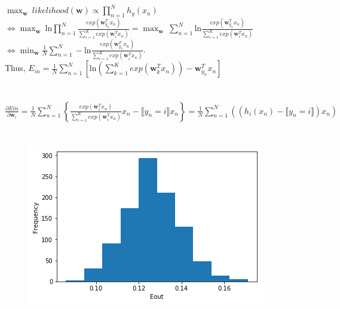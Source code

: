 \documentclass[a4paper,12pt]{article}
\begin{document}
\section{}
$\displaystyle \max_{\mathbf{w}} \ likelihood(\mathbf{w}) \propto \prod_{n=1}^{N} h_{y} (x_{n}) $ \\
$\Leftrightarrow \displaystyle \max_{\mathbf{w}} \ \text{ln} \prod_{n=1}^{N} \frac{exp(\mathbf{w}^{T}_{y_{n}}x_{n})}{\sum_{i=1}^{K}exp(\mathbf{w}_{i}^{T}x_{n})}=\displaystyle \max_{\mathbf{w}} \ \sum_{n=1}^{N} \text{ln}  \frac{exp(\mathbf{w}^{T}_{y_{n}}x_{n})}{\sum_{i=1}^{K}exp(\mathbf{w}_{i}^{T}x_{n})}$ \\
$\Leftrightarrow \displaystyle \min_{\mathbf{w}} \frac{1}{N} \sum_{n=1}^{N} -\text{ln}  \frac{exp(\mathbf{w}^{T}_{y_{n}}x_{n})}{\sum_{i=1}^{K}exp(\mathbf{w}_{i}^{T}x_{n})}$. \\
Thus, $\displaystyle E_{in}=\frac{1}{N} \displaystyle \sum_{n=1}^{N} \left [   \text{ln}(\sum_{k=1}^{K}exp(\mathbf{w}_{k}^{T}x_{n})) - \mathbf{w}_{y_{n}}^{T}x_{n} \right ]$

\section{}
$\displaystyle \frac{\partial Ein}{\partial \mathbf{w}_{i}}= \displaystyle \frac{1}{N} \sum_{n=1}^{N} \left \{  \frac{exp(\mathbf{w}_{i}^{T}x_{n})}{\sum_{i=1}^{K}exp(\mathbf{w}_{i}^{T}x_{n})}x_{n} - \llbracket y_{n}=i \rrbracket x_{n} \right \} = \frac{1}{N} \sum_{n=1}^{N} (  (h_{i}(x_{n})- \llbracket y_{n}=i \rrbracket ) x_{n})$


\section{}
\begin{figure}[h]
\centering
\includegraphics[scale=1]{Q7.png}
\end{figure}
\end{document}
